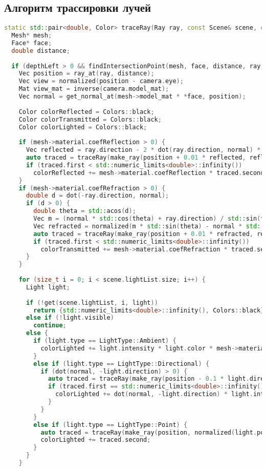 \subsection{Алгоритм трассировки лучей}

\begin{lstlisting}[language=C++]
static std::pair<double, Color> traceRay(Ray ray, const Scene& scene, const Camera& camera, int depthLeft) {
  Mesh* mesh;
  Face* face;
  double distance;
  
  if (depthLeft > 0 && findIntersectionPoint(mesh, face, distance, ray, scene)) {
    Vec position = ray_at(ray, distance);
    Vec view = normalized(position - camera.eye);
    Mat view_mat = inverse(camera.model_mat);
    Vec normal = get_normal_at(mesh->model_mat * *face, position);
    
    Color colorReflected = Colors::black;
    Color colorTransmitted = Colors::black;
    Color colorLighted = Colors::black;
    
    if (mesh->material.coefReflection > 0) {
      Vec reflected = ray.direction - 2 * dot(ray.direction, normal) * normal;
      auto traced = traceRay(make_ray(position + 0.01 * reflected, reflected), scene, camera, depthLeft - 1);
      if (traced.first < std::numeric_limits<double>::infinity())
        colorReflected += mesh->material.coefReflection * traced.second;
    }
    if (mesh->material.coefRefraction > 0) {
      double d = dot(-ray.direction, normal);
      if (d > 0) {
        double theta = std::acos(d);
        Vec m = (normal * std::cos(theta) + ray.direction) / std::sin(theta);
        Vec refracted = normalized(m * std::sin(theta) - normal * std::cos(theta));
        auto traced = traceRay(make_ray(position + 0.01 * refracted, refracted), scene, camera, depthLeft - 1);
        if (traced.first < std::numeric_limits<double>::infinity())
          colorTransmitted += mesh->material.coefRefraction * traced.second;
      }
    }
    
    for (size_t i = 0; i < scene.lightList.size; i++) {
      Light light;
  
      if (!get(scene.lightList, i, light))
        return {std::numeric_limits<double>::infinity(), Colors::black};
      else if (!light.visible)
        continue;
      else {
        if (light.type == LightType::Ambient) {
          colorLighted += light.intensity * light.color * mesh->material.ambientColor;
        }
        else if (light.type == LightType::Directional) {
          if (dot(normal, -light.direction) > 0) {
            auto traced = traceRay(make_ray(position - 0.1 * light.direction, -light.direction), scene, camera, depthLeft - 1);
            if (traced.first == std::numeric_limits<double>::infinity()) {
              colorLighted += dot(normal, -light.direction) * light.intensity * light.color;
            }
          }
        }
        else if (light.type == LightType::Point) {
          auto traced = traceRay(make_ray(position, normalized(light.position - position)), scene, camera, depthLeft - 1);
          colorLighted += traced.second;
        }
      }
    }
    

\end{lstlisting}
